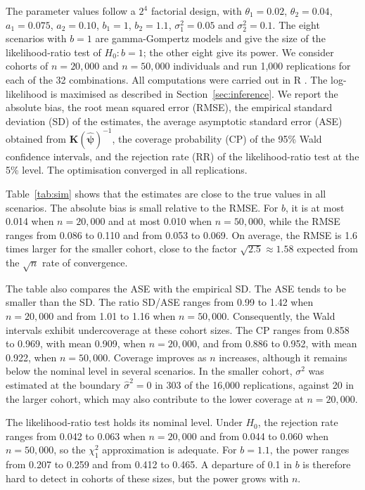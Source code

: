 \documentclass[12pt]{article}
\begin{document}
The parameter values follow a $2^4$ factorial design, with $\theta_1=0.02$, $\theta_2=0.04$, $a_1=0.075$, $a_2=0.10$, $b_1=1$, $b_2=1.1$, $\sigma^2_1=0.05$ and $\sigma^2_2=0.1$. The eight scenarios with $b=1$ are gamma-Gompertz models and give the size of the likelihood-ratio test of $H_0\colon b=1$; the other eight give its power. We consider cohorts of $n=20{,}000$ and $n=50{,}000$ individuals and run 1{,}000 replications for each of the 32 combinations. All computations were carried out in {\sf R} \citep{R2024}. The log-likelihood is maximised as described in Section~\ref{sec:inference}. We report the absolute bias, the root mean squared error (RMSE), the empirical standard deviation (SD) of the estimates, the average asymptotic standard error (ASE) obtained from $\bm{K}(\hat{\bm{\psi}})^{-1}$, the coverage probability (CP) of the 95\% Wald confidence intervals, and the rejection rate (RR) of the likelihood-ratio test at the 5\% level. The optimisation converged in all replications.

Table~\ref{tab:sim} shows that the estimates are close to the true values in all scenarios. The absolute bias is small relative to the RMSE. For $b$, it is at most 0.014 when $n=20{,}000$ and at most 0.010 when $n=50{,}000$, while the RMSE ranges from 0.086 to 0.110 and from 0.053 to 0.069. On average, the RMSE is 1.6 times larger for the smaller cohort, close to the factor $\sqrt{2.5}\approx1.58$ expected from the $\sqrt{n}$ rate of convergence.

The table also compares the ASE with the empirical SD. The ASE tends to be smaller than the SD. The ratio SD/ASE ranges from 0.99 to 1.42 when $n=20{,}000$ and from 1.01 to 1.16 when $n=50{,}000$. Consequently, the Wald intervals exhibit undercoverage at these cohort sizes. The CP ranges from 0.858 to 0.969, with mean 0.909, when $n=20{,}000$, and from 0.886 to 0.952, with mean 0.922, when $n=50{,}000$. Coverage improves as $n$ increases, although it remains below the nominal level in several scenarios. In the smaller cohort, $\sigma^2$ was estimated at the boundary $\hat\sigma^2=0$ in 303 of the 16{,}000 replications, against 20 in the larger cohort, which may also contribute to the lower coverage at $n=20{,}000$.

The likelihood-ratio test holds its nominal level. Under $H_0$, the rejection rate ranges from 0.042 to 0.063 when $n=20{,}000$ and from 0.044 to 0.060 when $n=50{,}000$, so the $\chi^2_1$ approximation is adequate. For $b=1.1$, the power ranges from 0.207 to 0.259 and from 0.412 to 0.465. A departure of 0.1 in $b$ is therefore hard to detect in cohorts of these sizes, but the power grows with $n$.
\end{document}
